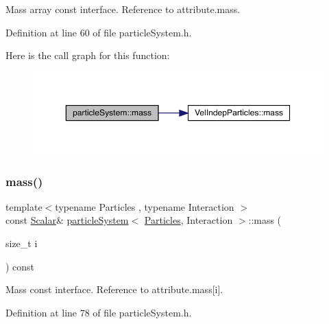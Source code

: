 Mass array const interface. Reference to attribute.\+mass. 



Definition at line 60 of file particle\+System.\+h.

Here is the call graph for this function\+:\nopagebreak
\begin{figure}[H]
\begin{center}
\leavevmode
\includegraphics[width=350pt]{classparticle_system_a8adc16a716e231f9840dd7f7e063f656_cgraph}
\end{center}
\end{figure}
\mbox{\label{classparticle_system_a1bbc12a8ac1923956f409e6f66cdc12d}} 
\subsubsection{\texorpdfstring{mass()}{mass()}\hspace{0.1cm}{\footnotesize\ttfamily [2/2]}}
{\footnotesize\ttfamily template$<$typename Particles , typename Interaction $>$ \\
const \mbox{\hyperlink{classparticle_system_a3938954186247e3eab01cc75fcc62b40}{Scalar}}\& \mbox{\hyperlink{classparticle_system}{particle\+System}}$<$ \mbox{\hyperlink{struct_particles}{Particles}}, Interaction $>$\+::mass (\begin{DoxyParamCaption}\item[{size\+\_\+t}]{i }\end{DoxyParamCaption}) const\hspace{0.3cm}{\ttfamily [inline]}}



Mass const interface. Reference to attribute.\+mass\mbox{[}i\mbox{]}. 



Definition at line 78 of file particle\+System.\+h.

